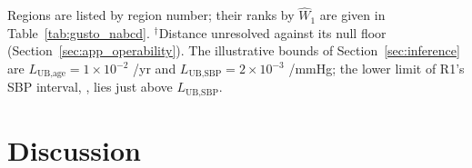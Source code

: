\documentclass[AMA,Times1COL]{WileyNJDv5}
\begin{document}
\begin{table}[ht]
\centering
\caption{$L^*$ at $\Delta_{\text{clin}} = 1$\%pt with 95\% percentile interval for all 15 partner regions, listed by region number. $L^*$ is the minimum clinical slope (per year for age, per mmHg for SBP) required for the observed distributional difference to produce a treatment effect difference of $1$\%pt on the absolute 30-day mortality scale.\label{tab:gusto_lstar_joint}}
\begin{tablenotes}
\item Regions are listed by region number; their ranks by $\widehat{W}_1$ are given in Table~\ref{tab:gusto_nabcd}. $^\dagger$Distance unresolved against its null floor (Section~\ref{sec:app_operability}). The illustrative bounds of Section~\ref{sec:inference} are $L_{\text{UB,age}} = 1\times10^{-2}$ /yr and $L_{\text{UB,SBP}} = 2\times10^{-3}$ /mmHg; the lower limit of R1's SBP interval, , lies just above $L_{\text{UB,SBP}}$.%
\end{tablenotes}
\end{table}

\section{Discussion}\label{sec:discussion}
\end{document}
